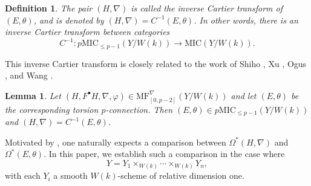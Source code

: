 \documentclass[12pt, a4paper]{article}
\newtheorem{definition}{Definition}[section]
\newtheorem{lemma}{Lemma}[section]
\begin{document}
\begin{definition}
The pair $(H, \nabla)$ is called the inverse Cartier transform of $(E, \theta)$, and is denoted by $(H, \nabla) = C^{-1}(E, \theta)$. In other words, there is an inverse Cartier transform between categories 
$$
C^{-1}:p\mathrm{MIC}_{\leq p-1}(Y/W(k))\to\mathrm{MIC}(Y/W(k)).
$$
\end{definition}
This inverse Cartier transform is closely related to the work of Shiho \cite{Shi}, Xu \cite{X}, Ogus \cite{O24}, and Wang \cite{W}.

\begin{lemma}
Let $(H,F^\bullet H,\nabla,\varphi)\in\mathrm{MF}^\nabla_{[0,p-2]}(Y/W(k))$ and let $(E,\theta)$ be the corresponding torsion  $p$-connection. Then $(E,\theta)\in p\mathrm{MIC}_{\leq p-1}(Y/W(k))$ and $(H,\nabla)=C^{-1}(E,\theta)$.
\end{lemma}  
Motivated by \cite[Corollary 2.27]{OV}, one naturally expects a comparison between $\Omega^*(H,\nabla)$ and  $\Omega^*(E,\theta)$. In this paper, we establish such a comparison in the case where 
$$Y = Y_1 \times_{W(k)} \cdots \times_{W(k)} Y_n,$$ 
with each $Y_i$ a smooth $W(k)$-scheme of relative dimension one.
\end{document}
